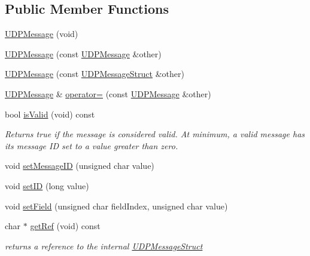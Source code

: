 \subsection*{Public Member Functions}
\begin{DoxyCompactItemize}
\item 
\hyperlink{class_u_d_p_message_a823351519fc5818ccc03030c6947e620}{U\+D\+P\+Message} (void)
\item 
\hyperlink{class_u_d_p_message_adbc0139ef0249efd4a932bbc0b57fe13}{U\+D\+P\+Message} (const \hyperlink{class_u_d_p_message}{U\+D\+P\+Message} \&other)
\item 
\hyperlink{class_u_d_p_message_a6edf87f4f8f441edf2064d5f6fa5cd02}{U\+D\+P\+Message} (const \hyperlink{struct_u_d_p_message_struct}{U\+D\+P\+Message\+Struct} \&other)
\item 
\hyperlink{class_u_d_p_message}{U\+D\+P\+Message} \& \hyperlink{class_u_d_p_message_af3bb7f16fec948bcfbf99646b79c5c58}{operator=} (const \hyperlink{class_u_d_p_message}{U\+D\+P\+Message} \&other)
\item 
\mbox{\label{class_u_d_p_message_ad732ecdc07825ce944b251b0e8f55e90}} 
bool \hyperlink{class_u_d_p_message_ad732ecdc07825ce944b251b0e8f55e90}{is\+Valid} (void) const
\begin{DoxyCompactList}\small\item\em Returns true if the message is considered valid. At minimum, a valid message has its message ID set to a value greater than zero. \end{DoxyCompactList}\item 
void \hyperlink{class_u_d_p_message_aba4aadebe7b1aa92ba558f3cd4319e79}{set\+Message\+ID} (unsigned char value)
\item 
void \hyperlink{class_u_d_p_message_a2fcacc64fbb5598848a391c9fd9aa8c2}{set\+ID} (long value)
\item 
void \hyperlink{class_u_d_p_message_ad7f1c729cf357be18e6cda695f5e5d99}{set\+Field} (unsigned char field\+Index, unsigned char value)
\item 
\mbox{\label{class_u_d_p_message_aeea2288e53b4c6db7861181b5fc8aa5e}} 
char $\ast$ \hyperlink{class_u_d_p_message_aeea2288e53b4c6db7861181b5fc8aa5e}{get\+Ref} (void) const
\begin{DoxyCompactList}\small\item\em returns a reference to the internal \hyperlink{struct_u_d_p_message_struct}{U\+D\+P\+Message\+Struct} \end{DoxyCompactList}\item 

\end{DoxyCompactItemize}
